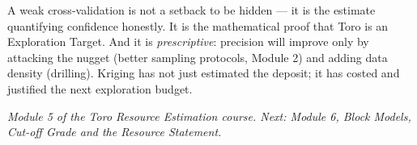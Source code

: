 \documentclass[11pt]{article}
\begin{document}
\begin{keybox}
A weak cross-validation is not a setback to be hidden --- it is the
estimate quantifying confidence honestly. It is the mathematical proof
that Toro is an Exploration Target. And it is \emph{prescriptive}:
precision will improve only by attacking the nugget (better sampling
protocols, Module 2) and adding data density (drilling). Kriging has
not just estimated the deposit; it has costed and justified the next
exploration budget.
\end{keybox}

\vspace{4pt}{\color{line}\hrule}\vspace{4pt}
{\small\itshape Module 5 of the Toro Resource Estimation course. Next:
Module 6, Block Models, Cut-off Grade and the Resource Statement.}
\end{document}

